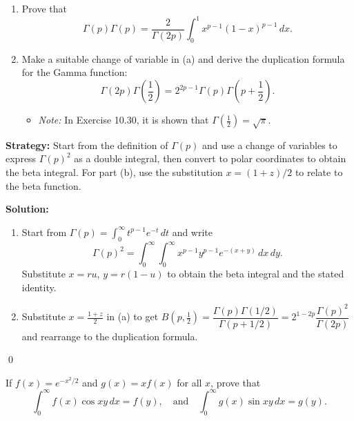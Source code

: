 \begin{problembox}
\begin{problemstatement}
\begin{enumerate}[label=(\alph*)]
\item Prove that
\[
\Gamma(p) \Gamma(p) = \frac{2}{\Gamma(2p)} \int_0^1 x^{p-1} (1 - x)^{p-1} \, dx.
\]
\item Make a suitable change of variable in (a) and derive the duplication formula for the Gamma function:
\[
\Gamma(2p) \Gamma\left(\frac{1}{2}\right) = 2^{2p-1} \Gamma(p) \Gamma\left(p + \frac{1}{2}\right).
\]
\begin{itemize}
\item \textit{Note:} In Exercise 10.30, it is shown that $\Gamma\left(\frac{1}{2}\right) = \sqrt{\pi}$.
\end{itemize}
\end{enumerate}
\end{problemstatement}
\end{problembox}

\noindent\textbf{Strategy:} Start from the definition of $\Gamma(p)$ and use a change of variables to express $\Gamma(p)^2$ as a double integral, then convert to polar coordinates to obtain the beta integral. For part (b), use the substitution $x=(1+z)/2$ to relate to the beta function.

\bigskip\noindent\textbf{Solution:}
\begin{enumerate}[label=(\alph*)]
\item Start from $\Gamma(p)=\int_0^{\infty} t^{p-1}e^{-t}\,dt$ and write 
$$\Gamma(p)^2=\int_0^{\infty}\int_0^{\infty} x^{p-1}y^{p-1}e^{-(x+y)}\,dx\,dy.$$ Substitute $x=ru$, $y=r(1-u)$ to obtain the beta integral and the stated identity.
\item Substitute $x=\tfrac{1+z}{2}$ in (a) to get $B(p,\tfrac12)=\dfrac{\Gamma(p)\Gamma(1/2)}{\Gamma(p+1/2)}=2^{1-2p}\dfrac{\Gamma(p)^2}{\Gamma(2p)}$ and rearrange to the duplication formula.
\end{enumerate}\qed


\begin{problembox}
\begin{problemstatement}
If $f(x) = e^{-x^2/2}$ and $g(x) = x f(x)$ for all $x$, prove that
\[
\int_0^\infty f(x) \cos xy \, dx = f(y), \quad \text{and} \quad \int_0^\infty g(x) \sin xy \, dx = g(y).
\]
\end{problemstatement}
\end{problembox}

